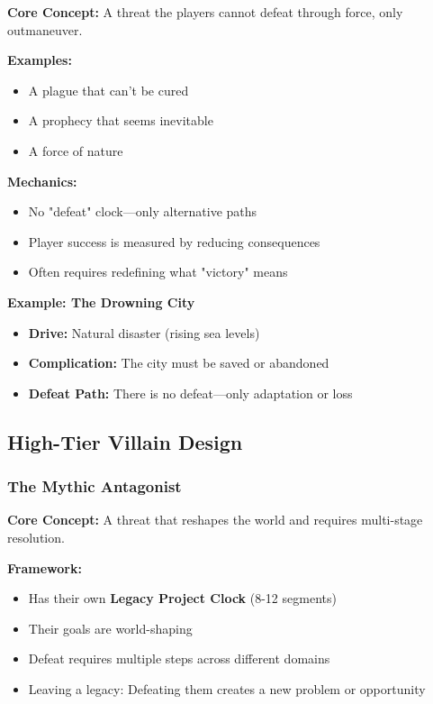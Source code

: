 \textbf{Core Concept:} A threat the players cannot defeat through force, only outmaneuver.

\textbf{Examples:}
\begin{itemize}
  \item A plague that can't be cured
  \item A prophecy that seems inevitable
  \item A force of nature
\end{itemize}

\textbf{Mechanics:}
\begin{itemize}
  \item No "defeat" clock---only alternative paths
  \item Player success is measured by reducing consequences
  \item Often requires redefining what "victory" means
\end{itemize}

\textbf{Example: The Drowning City}
\begin{itemize}
  \item \textbf{Drive:} Natural disaster (rising sea levels)
  \item \textbf{Complication:} The city must be saved or abandoned
  \item \textbf{Defeat Path:} There is no defeat---only adaptation or loss
\end{itemize}

\subsection{High-Tier Villain Design}

\subsubsection{The Mythic Antagonist}

\textbf{Core Concept:} A threat that reshapes the world and requires multi-stage resolution.

\textbf{Framework:}
\begin{itemize}
  \item Has their own \textbf{Legacy Project Clock} (8-12 segments)
  \item Their goals are world-shaping
  \item Defeat requires multiple steps across different domains
  \item Leaving a legacy: Defeating them creates a new problem or opportunity
\end{itemize}

